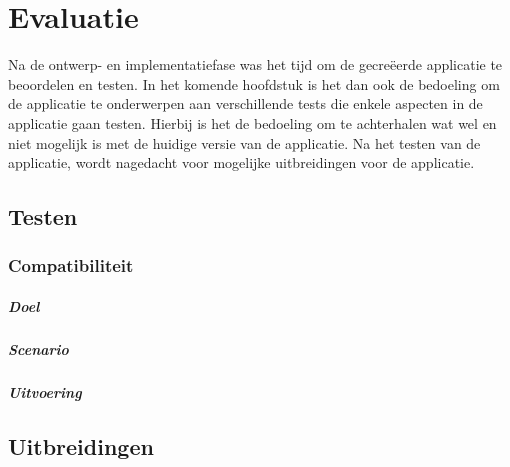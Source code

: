 \chapter{Evaluatie}
Na de ontwerp- en implementatiefase was het tijd om de gecreëerde applicatie te beoordelen en testen.
In het komende hoofdstuk is het dan ook de bedoeling om de applicatie te onderwerpen aan verschillende tests die enkele aspecten in de applicatie gaan testen.
Hierbij is het de bedoeling om te achterhalen wat wel en niet mogelijk is met de huidige versie van de applicatie.
Na het testen van de applicatie, wordt nagedacht voor mogelijke uitbreidingen voor de applicatie.

\section{Testen}
\subsection{Compatibiliteit}
\paragraph{Doel}

\paragraph{Scenario}

\paragraph{Uitvoering}

\section{Uitbreidingen}



